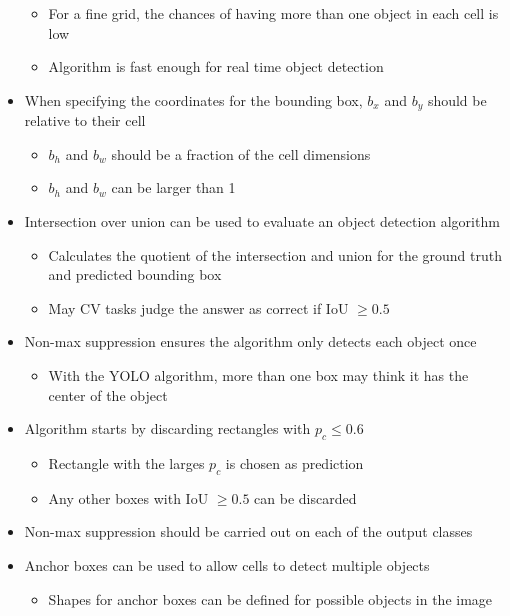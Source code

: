\documentclass[12pt, letterpaper]{article}
\begin{document}
\begin{itemize}
\begin{itemize}
            \item For a fine grid, the chances of having more than one object in each cell is low
            \item Algorithm is fast enough for real time object detection
        \end{itemize}
        \item When specifying the coordinates for the bounding box, $b_x$ and $b_y$ should be relative to their cell
        \begin{itemize}
            \item $b_h$ and $b_w$ should be a fraction of the cell dimensions
            \item $b_h$ and $b_w$ can be larger than 1
        \end{itemize}
        \item Intersection over union can be used to evaluate an object detection algorithm
        \begin{itemize}
            \item Calculates the quotient of the intersection and union for the ground truth and predicted bounding box
            \item May CV tasks judge the answer as correct if IoU $\geq 0.5$ 
        \end{itemize}
        \item Non-max suppression ensures the algorithm only detects each object once
        \begin{itemize}
            \item With the YOLO algorithm, more than one box may think it has the center of the object  
        \end{itemize}
        \item Algorithm starts by discarding rectangles with $p_c \leq0.6$
        \begin{itemize}
            \item Rectangle with the larges $p_c$ is chosen as prediction
            \item Any other boxes with IoU $\geq0.5$ can be discarded
        \end{itemize}
        \item Non-max suppression should be carried out on each of the output classes
        \item Anchor boxes can be used to allow cells to detect multiple objects
        \begin{itemize}
            \item Shapes for anchor boxes can be defined for possible objects in the image

\end{itemize}
\end{itemize}
\end{document}
